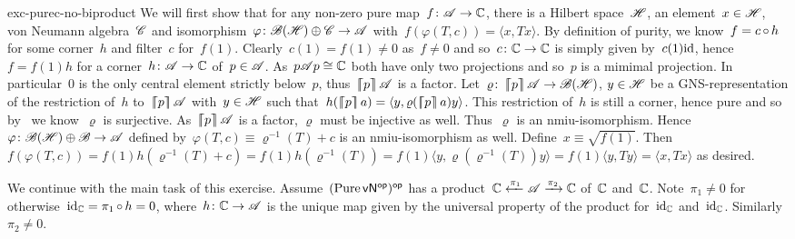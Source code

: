 \begin{solution}{exc-purec-no-biproduct}%
   We will first show that for any non-zero pure map~$f\colon \mathscr{A} \to \mathbb{C}$,
        there is a Hilbert space~$\mathscr{H}$, an element~$x \in \mathscr{H}$,
    von Neumann algebra~$\mathscr{C}$ and isomorphism~$\varphi\colon \mathscr{B}(\mathscr{H})\oplus \mathscr{C} \to \mathscr{A}$
    with~$f (\varphi (T, c))= \langle x, T x\rangle$.
By definition of purity, we know~$f = c \mathop{\circ} h$
    for some corner~$h$ and filter~$c$ for~$f(1)$.
Clearly~$c(1)=f(1) \neq 0$ as~$f\neq 0$ and
    so~$c\colon \mathbb{C} \to \mathbb{C}$ is simply given by~$c(1)\mathrm{id}$,
    hence~$f = f(1) h$ for a corner~$h\colon \mathscr{A} \to \mathbb{C}$
        of~$p \in \mathscr{A}$.
    As~$p \mathscr{A} p \cong \mathbb{C}$ both have only two projections
        and so~$p$ is a mimimal projection.
    In particular~$0$ is the only central element strictly below~$p$,
        thus~$\left\lceil\!\!\left\lceil p\right\rceil\!\!\right\rceil\mathscr{A}$ is a factor.
Let~$\varrho\colon \left\lceil\!\!\left\lceil p\right\rceil\!\!\right\rceil\mathscr{A} \to \mathscr{B}(\mathscr{H})$, $y\in \mathscr{H}$
    be a GNS-representation of the restriction of~$h$ to~$\left\lceil\!\!\left\lceil p\right\rceil\!\!\right\rceil\mathscr{A}$
    with~$y\in\mathscr{H}$ such that~$h(\cceil{p}a) = \langle y, \varrho(\cceil{p}a) y \rangle$.
    This restriction of~$h$ is still a corner, hence pure
    and so by~ we know~$\varrho$ is surjective.
    As~$\left\lceil\!\!\left\lceil p\right\rceil\!\!\right\rceil\mathscr{A}$ is a factor, $\varrho$ must be injective as well.
    Thus~$\varrho$ is an nmiu-isomorphism.
    Hence~$\varphi\colon \mathscr{B}(\mathscr{H}) \oplus \mathscr{B} \to \mathscr{A}$
        defined by~$\varphi(T,c) \equiv \varrho^{-1}(T) + c$
                is an nmiu-isomorphism as well.
Define~$x \equiv \sqrt{f(1)}$. Then~$f(\varphi(T, c))
            = f(1) h(\varrho^{-1}(T) + c)
            = f(1) h(\varrho^{-1}(T))
            = f(1) \langle y, \varrho (\varrho^{-1}(T)) y \rangle
            = f(1) \langle y, T y \rangle
            =  \langle x, T x \rangle$ as desired.

We continue with the main task of this exercise.
Assume~$(\operatorname{Pure} {\mathsf{vN}}{^{\mathsf{op}}})^{\mathsf{op}}$ has a
        product~$ \mathbb{C} \xleftarrow{\pi_1} \mathscr{A} \xrightarrow{\pi_2} \mathbb{C}$
        of~$\mathbb{C}$ and~$\mathbb{C}$.
Note~$\pi_1 \neq 0$
    for otherwise~$\mathrm{id}_{\mathbb{C}} = \pi_1 \mathop{\circ} h = 0$,
    where~$h\colon \mathbb{C} \to \mathscr{A}$ is the unique map given by the universal property
    of the product for~$\mathrm{id}_{\mathbb{C}}$ and~$\mathrm{id}_{\mathbb{C}}$.
    Similarly~$\pi_2 \neq 0$.


\end{solution}
